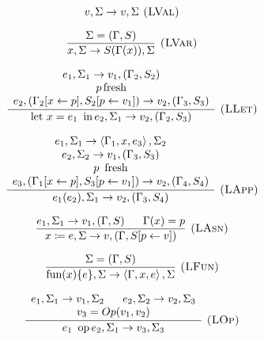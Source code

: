 \documentclass[english]{llncs}
\begin{document}
\begin{figure}
{\footnotesize{}}%
\begin{minipage}[t]{0.59\columnwidth}%
{\footnotesize{}
\[
v,\Sigma\rightarrow v,\Sigma\textsc{ (LVal)}
\]
}{\footnotesize \par}

{\footnotesize{}
\[
\frac{\Sigma=(\Gamma,S)}{x,\Sigma\rightarrow S(\Gamma(x)),\Sigma}\textsc{ (LVar)}
\]
}{\footnotesize \par}

{\footnotesize{}
\[
\frac{\begin{array}[t]{c}
e_{1},\Sigma_{1}\rightarrow v_{1},(\Gamma_{2},S_{2})\\
p\,\mbox{fresh}\\
e_{2},(\Gamma_{2}[x\leftarrow p],S_{2}[p\leftarrow v_{1}])\rightarrow v_{2},(\Gamma_{3},S_{3})
\end{array}}{\mbox{let \ensuremath{x=e_{1}}\,\ in\,\ensuremath{e_{2}}},\Sigma_{1}\rightarrow v_{2},(\Gamma_{2},S_{3})}\textsc{ (LLet)}
\]
}{\footnotesize \par}

{\footnotesize{}
\[
\frac{\begin{array}[t]{c}
e_{1},\Sigma_{1}\rightarrow\left\langle \Gamma_{1},x,e_{3}\right\rangle ,\Sigma_{2}\\
e_{2},\Sigma_{2}\rightarrow v_{1},(\Gamma_{3},S_{3})\\
\mbox{\ensuremath{p}\,\ fresh}\\
e_{3},(\Gamma_{1}[x\leftarrow p],S_{3}[p\leftarrow v_{1}])\rightarrow v_{2},(\Gamma_{4},S_{4})
\end{array}}{e_{1}(e_{2}),\Sigma_{1}\rightarrow v_{2},(\Gamma_{3},S_{4})}\textsc{ (LApp)}
\]
}{\footnotesize \par}

{\footnotesize{}
\[
\frac{e_{1},\Sigma_{1}\rightarrow v_{1},(\Gamma,S)\,\,\,\,\,\,\,\,\,\,\Gamma(x)=p}{x\coloneqq e,\Sigma\rightarrow v,(\Gamma,S[p\leftarrow v])}\textsc{ (LAsn)}
\]
}{\footnotesize \par}

{\footnotesize{}
\[
\frac{\Sigma=(\Gamma,S)}{\mbox{fun(\ensuremath{x})\{\ensuremath{e}\}},\Sigma\rightarrow\left\langle \Gamma,x,e\right\rangle ,\Sigma}\textsc{ (LFun)}
\]
}{\footnotesize \par}

{\footnotesize{}
\[
\frac{\begin{array}[t]{c}
e_{1},\Sigma_{1}\rightarrow v_{1},\Sigma_{2}\,\,\,\,\,\,\,\,\,\, e_{2},\Sigma_{2}\rightarrow v_{2},\Sigma_{3}\\
v_{3}=Op(v_{1},v_{2})
\end{array}}{e_{1}\mbox{\,\ op\,}e_{2},\Sigma_{1}\rightarrow v_{3},\Sigma_{3}}\textsc{ (LOp)}
\]
}{\footnotesize \par}


\end{minipage}
\end{figure}
\end{document}
